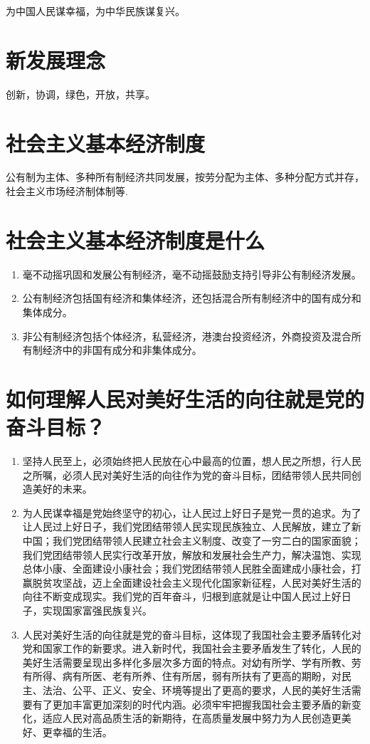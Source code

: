 \documentclass[12pt, a4paper, oneside]{ctexbook}
\begin{document}
为中国人民谋幸福，为中华民族谋复兴。

\section{新发展理念}

创新，协调，绿色，开放，共享。

\section{社会主义基本经济制度}

公有制为主体、多种所有制经济共同发展，按劳分配为主体、多种分配方式并存，社会主义市场经济制体制等.

\section{社会主义基本经济制度是什么}

\begin{enumerate}
\item 毫不动摇巩固和发展公有制经济，毫不动摇鼓励支持引导非公有制经济发展。

\item 公有制经济包括国有经济和集体经济，还包括混合所有制经济中的国有成分和集体成分。

\item 非公有制经济包括个体经济，私营经济，港澳台投资经济，外商投资及混合所有制经济中的非国有成分和非集体成分。
\end{enumerate}

\section{如何理解人民对美好生活的向往就是党的奋斗目标？}

\begin{enumerate}
\item 坚持人民至上，必须始终把人民放在心中最高的位置，想人民之所想，行人民之所嘱，必须人民对美好生活的向往作为党的奋斗目标，团结带领人民共同创造美好的未来。

\item 为人民谋幸福是党始终坚守的初心，让人民过上好日子是党一贯的追求。为了让人民过上好日子，我们党团结带领人民实现民族独立、人民解放，建立了新中国；我们党团结带领人民建立社会主义制度、改变了一穷二白的国家面貌；我们党团结带领人民实行改革开放，解放和发展社会生产力，解决温饱、实现总体小康、全面建设小康社会；我们党团结带领人民胜全面建成小康社会，打赢脱贫攻坚战，迈上全面建设社会主义现代化国家新征程，人民对美好生活的向往不断变成现实。我们党的百年奋斗，归根到底就是让中国人民过上好日子，实现国家富强民族复兴。

\item 人民对美好生活的向往就是党的奋斗目标，这体现了我国社会主要矛盾转化对党和国家工作的新要求。进入新时代，我国社会主要矛盾发生了转化，人民的美好生活需要呈现出多样化多层次多方面的特点。对幼有所学、学有所教、劳有所得、病有所医、老有所养、住有所居，弱有所扶有了更高的期盼，对民主、法治、公平、正义、安全、环境等提出了更高的要求，人民的美好生活需要有了更加丰富更加深刻的时代内涵。必须牢牢把握我国社会主要矛盾的新变化，适应人民对高品质生活的新期待，在高质量发展中努力为人民创造更美好、更幸福的生活。
\end{enumerate}
\end{document}
